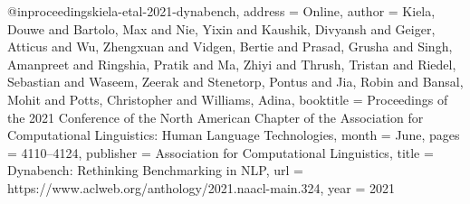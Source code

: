 @inproceedings{kiela-etal-2021-dynabench,
	address = {Online},
	author = {Kiela, Douwe and Bartolo, Max and Nie, Yixin and Kaushik, Divyansh and Geiger, Atticus and Wu, Zhengxuan and Vidgen, Bertie and Prasad, Grusha and Singh, Amanpreet and Ringshia, Pratik and Ma, Zhiyi and Thrush, Tristan and Riedel, Sebastian and Waseem, Zeerak and Stenetorp, Pontus and Jia, Robin and Bansal, Mohit and Potts, Christopher and Williams, Adina},
	booktitle = {Proceedings of the 2021 Conference of the North American Chapter of the Association for Computational Linguistics: Human Language Technologies},
	month = {June},
	pages = {4110--4124},
	publisher = {Association for Computational Linguistics},
	title = {Dynabench: Rethinking Benchmarking in {NLP}},
	url = {https://www.aclweb.org/anthology/2021.naacl-main.324},
	year = {2021}}
